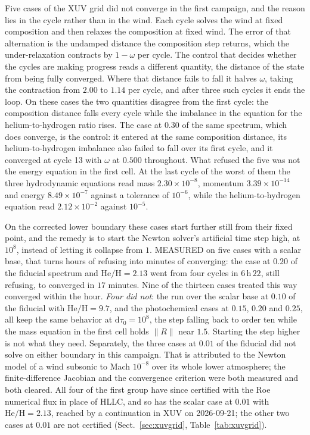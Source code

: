 \documentclass[english,a4paper]{my_memo}
\begin{document}
Five cases of the XUV grid did not converge in the first campaign, and the
reason lies in the cycle rather than in the wind. Each cycle solves the wind
at fixed composition and then relaxes the composition at fixed wind. The
error of that alternation is the undamped distance the composition step
returns, which the under-relaxation contracts by $1-\omega$ per cycle. The
control that decides whether the cycles are making progress reads a different
quantity, the distance of the state from being fully converged. Where that
distance fails to fall it halves $\omega$, taking the contraction from $2.00$
to $1.14$ per cycle, and after three such cycles it ends the loop. On these
cases the two quantities disagree from the first cycle: the composition
distance falls every cycle while the imbalance in the equation for the
helium-to-hydrogen ratio rises. The case at $0.30$ of the same spectrum,
which does converge, is the control: it entered at the same composition
distance, its helium-to-hydrogen imbalance also failed to fall over its first
cycle, and it converged at cycle 13 with $\omega$ at $0.500$ throughout. What
refused the five was not the energy equation in the first cell. At the last
cycle of the worst of them the three hydrodynamic equations read mass
$2.30\times10^{-8}$, momentum $3.39\times10^{-14}$ and energy
$8.49\times10^{-7}$ against a tolerance of $10^{-6}$, while the
helium-to-hydrogen equation read $2.12\times10^{-2}$ against $10^{-5}$.

On the corrected lower boundary these cases start further still from their
fixed point, and the remedy is to start the Newton solver's artificial time
step high, at $10^{8}$, instead of letting it collapse from $1$. MEASURED on
five cases with a scalar base, that turns hours of refusing into minutes of
converging: the case at $0.20$ of the fiducial spectrum and
$\mathrm{He/H} = 2.13$ went from four cycles in $6$\,h\,$22$, still refusing,
to converged in $17$ minutes. Nine of the thirteen cases treated this way
converged within the hour. \emph{Four did not}: the run over the scalar base
at $0.10$ of the fiducial with $\mathrm{He/H} = 9.7$, and the photochemical
cases at $0.15$, $0.20$ and $0.25$, all keep the same behavior at
$\mathrm{d}\tau_0 = 10^{8}$, the step falling back to order ten while the
mass equation in the first cell holds $\|R\|$ near $1.5$. Starting the step
higher is not what they need. Separately, the three cases at $0.01$ of the
fiducial did not solve on either boundary in this campaign. That is
attributed to the Newton model of a wind subsonic to Mach $10^{-8}$ over its
whole lower atmosphere; the finite-difference Jacobian and the convergence
criterion were both measured and both cleared. All four of the first group
have since certified with the Roe numerical flux in place of HLLC, and so has
the scalar case at $0.01$ with $\mathrm{He/H} = 2.13$, reached by a
continuation in XUV on 2026-09-21; the other two cases at $0.01$ are not
certified (Sect.~\ref{sec:xuvgrid}, Table~\ref{tab:xuvgrid}).
\end{document}
